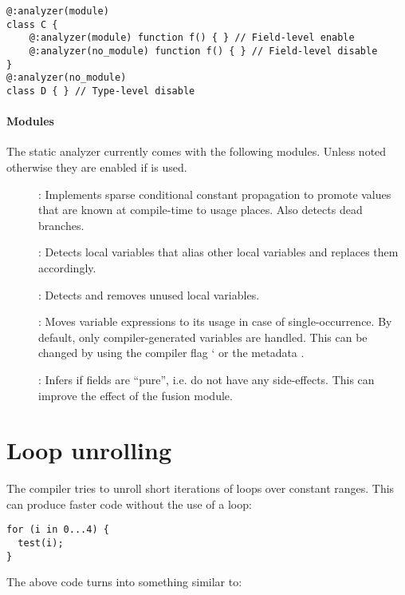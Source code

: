 \begin{lstlisting}
@:analyzer(module)
class C {
	@:analyzer(module) function f() { } // Field-level enable
	@:analyzer(no_module) function f() { } // Field-level disable
}
@:analyzer(no_module)
class D { } // Type-level disable
\end{lstlisting}

\paragraph{Modules}
\label{cr-static-analyzer-modules}

The static analyzer currently comes with the following modules. Unless noted otherwise they are enabled if  is used.

\begin{description}
\item[]: Implements sparse conditional constant propagation to promote values that are known at compile-time to usage places. Also detects dead branches.
\item[]: Detects local variables that alias other local variables and replaces them accordingly.
\item[]: Detects and removes unused local variables.
\item[]: Moves variable expressions to its usage in case of single-occurrence. By default, only compiler-generated variables are handled. This can be changed by using the compiler flag ` or the metadata .
\item[]: Infers if fields are ``pure'', i.e. do not have any side-effects. This can improve the effect of the fusion module.
\end{description}


\section{Loop unrolling}
\label{cr-loop-unrolling}

The compiler tries to unroll short iterations of  loops over constant ranges. This can produce faster code without the use of a loop:

\begin{lstlisting}
for (i in 0...4) {
  test(i);
}
\end{lstlisting}

The above code turns into something similar to:

